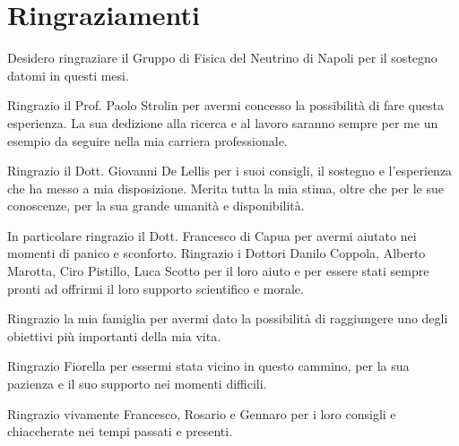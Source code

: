 \chapter*{Ringraziamenti}

Desidero ringraziare il Gruppo di Fisica del Neutrino di Napoli per il sostegno datomi in questi mesi.

Ringrazio il Prof. Paolo Strolin per avermi concesso la possibilit\`a di fare questa esperienza. La sua dedizione alla ricerca e al lavoro saranno sempre per me un esempio da seguire nella mia carriera professionale.


Ringrazio il Dott. Giovanni De Lellis per i suoi consigli, il sostegno e l'esperienza che ha messo a mia disposizione. Merita tutta la mia stima, oltre che per le sue conoscenze, per la sua grande umanit\`a e disponibilit\`a.

In particolare ringrazio il Dott. Francesco di Capua per avermi  aiutato nei momenti di panico e sconforto. Ringrazio i Dottori Danilo Coppola, Alberto Marotta, Ciro Pistillo, Luca Scotto per il loro aiuto e per essere stati sempre pronti ad offrirmi il loro supporto scientifico e morale. 

Ringrazio la mia famiglia per avermi dato la possibilit\`a di raggiungere uno degli obiettivi pi\`u importanti della mia vita. 

Ringrazio Fiorella per essermi stata vicino in questo cammino, per la sua pazienza e il suo supporto nei momenti difficili.


Ringrazio vivamente Francesco, Rosario e Gennaro per i loro consigli e chiaccherate nei tempi passati e presenti.
